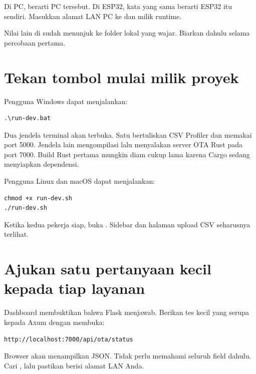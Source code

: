 \begin{warningbox}
Di PC,  berarti PC tersebut. Di ESP32, kata yang sama berarti ESP32 itu sendiri. Masukkan alamat LAN PC ke  dan  milik runtime.
\end{warningbox}

Nilai lain di  sudah menunjuk ke folder lokal yang wajar. Biarkan dahulu selama percobaan pertama.

\section{Tekan tombol mulai milik proyek}

Pengguna Windows dapat menjalankan:

\begin{lstlisting}
.\run-dev.bat
\end{lstlisting}

Dua jendela terminal akan terbuka. Satu bertuliskan CSV Profiler dan memakai port 5000. Jendela lain mengompilasi lalu menyalakan server OTA Rust pada port 7000. Build Rust pertama mungkin diam cukup lama karena Cargo sedang menyiapkan dependensi.

Pengguna Linux dan macOS dapat menjalankan:

\begin{lstlisting}
chmod +x run-dev.sh
./run-dev.sh
\end{lstlisting}

Ketika kedua pekerja siap, buka . Sidebar dan halaman upload CSV seharusnya terlihat.

\section{Ajukan satu pertanyaan kecil kepada tiap layanan}

Dashboard membuktikan bahwa Flask menjawab. Berikan tes kecil yang serupa kepada Axum dengan membuka:

\begin{lstlisting}[numbers=none]
http://localhost:7000/api/ota/status
\end{lstlisting}

Browser akan menampilkan JSON. Tidak perlu memahami seluruh field dahulu. Cari , lalu pastikan  berisi alamat LAN Anda.

